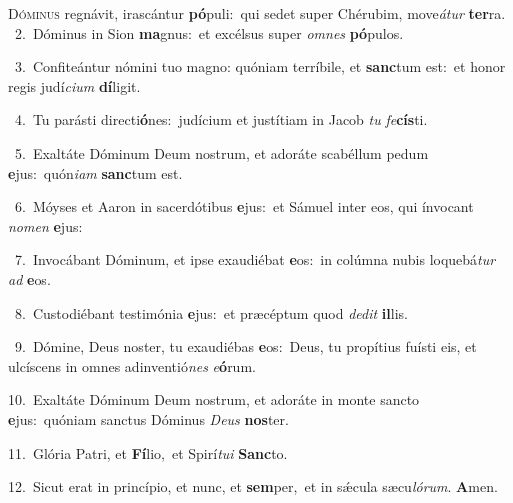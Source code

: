 \lettrine{\initial\textcolor{\initialcolor}{D}}{óminus} regnávit, irascántur \textbf{pó}\-puli:~\star qui sedet super Chérubim, move\-\textit{á}\-\textit{tur} \textbf{ter}\-ra.\\
{\numbfont\textcolor{\numbcolor}{~2.}}~Dóminus in Sion \textbf{ma}\-gnus:~\star et excélsus super \textit{om}\-\textit{nes} \textbf{pó}\-pulos.\par
{\numbfont\textcolor{\numbcolor}{~3.}}~Confiteántur nómini tuo magno: quóniam terríbile, et \textbf{sanc}\-tum est:~\star et honor regis judí\-\textit{ci}\-\textit{um} \textbf{dí}\-ligit.\par
{\numbfont\textcolor{\numbcolor}{~4.}}~Tu parásti directi\-\textbf{ó}\-nes:~\star judícium et justítiam in Jacob \textit{tu} \textit{fe}\-\textbf{cís}ti.\par
{\numbfont\textcolor{\numbcolor}{~5.}}~Exaltáte Dóminum Deum nostrum, et adoráte scabéllum pedum \textbf{e}\-jus:~\star quón\-\textit{i}\-\textit{am} \textbf{sanc}\-tum est.\par
{\numbfont\textcolor{\numbcolor}{~6.}}~Móyses et Aaron in sacerdótibus \textbf{e}\-jus:~\star et Sámuel inter eos, qui ínvocant \textit{no}\-\textit{men} \textbf{e}\-jus:\par
{\numbfont\textcolor{\numbcolor}{~7.}}~Invocábant Dóminum, et ipse exaudiébat \textbf{e}\-os:~\star in colúmna nubis loquebá\textit{tur} \textit{ad} \textbf{e}\-os.\par
{\numbfont\textcolor{\numbcolor}{~8.}}~Custodiébant testimónia \textbf{e}\-jus:~\star et præcéptum quod \textit{de}\-\textit{dit} \textbf{il}\-lis.\par
{\numbfont\textcolor{\numbcolor}{~9.}}~Dómine, Deus noster, tu exaudiébas \textbf{e}\-os:~\star Deus, tu propítius fuísti eis, et ulcíscens in omnes adinventió\textit{nes} \textit{e}\-\textbf{ó}rum.\par
{\numbfont\textcolor{\numbcolor}{10.}}~Exaltáte Dóminum Deum nostrum, et adoráte in monte sancto \textbf{e}\-jus:~\star quóniam sanctus Dóminus \textit{De}\-\textit{us} \textbf{nos}\-ter.\par
{\numbfont\textcolor{\numbcolor}{11.}}~Glória Patri, et \textbf{Fí}\-lio,~\star et Spirí\-\textit{tu}\-\textit{i} \textbf{Sanc}\-to.\par
{\numbfont\textcolor{\numbcolor}{12.}}~Sicut erat in princípio, et nunc, et \textbf{sem}\-per,~\star et in sǽcula sæcu\-\textit{ló}\-\textit{rum}. \textbf{A}\-men.\par
